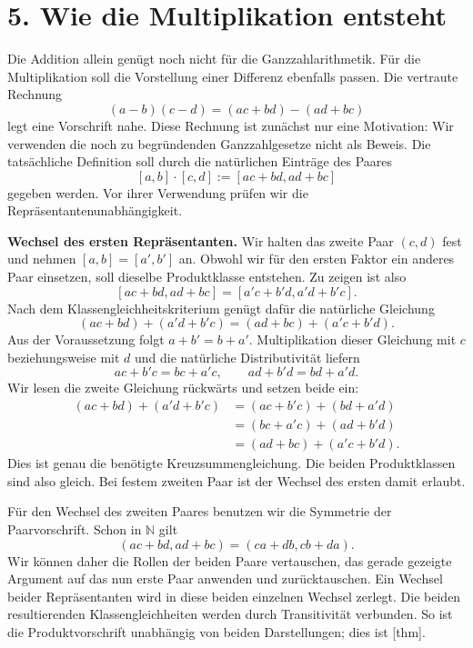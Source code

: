 \par{}
\hypertarget{integers.reading.multiplication}{}
\section*{5. Wie die Multiplikation entsteht}

Die Addition allein genügt noch nicht für die Ganzzahlarithmetik.
Für die Multiplikation soll die Vorstellung einer Differenz ebenfalls
passen. Die vertraute Rechnung
\[
  (a-b)(c-d)=(ac+bd)-(ad+bc)
\]
legt eine Vorschrift nahe. Diese Rechnung ist zunächst nur eine
Motivation: Wir verwenden die noch zu begründenden Ganzzahlgesetze
nicht als Beweis. Die tatsächliche Definition soll durch die
natürlichen Einträge des Paares
\[
  [a,b]\cdot[c,d]:=[ac+bd,ad+bc]
\]
gegeben werden. Vor ihrer Verwendung prüfen wir die
Repräsentantenunabhängigkeit.

\medskip\noindent\textbf{Wechsel des ersten Repräsentanten.}
Wir halten das zweite Paar \((c,d)\) fest und nehmen
\([a,b]=[a',b']\) an. Obwohl wir für den ersten Faktor ein
anderes Paar einsetzen, soll dieselbe Produktklasse entstehen.
Zu zeigen ist also
\[
  [ac+bd,ad+bc]=[a'c+b'd,a'd+b'c].
\]
Nach dem Klassengleichheitskriterium genügt dafür die natürliche
Gleichung
\[
  (ac+bd)+(a'd+b'c)=(ad+bc)+(a'c+b'd).
\]
Aus der Voraussetzung folgt \(a+b'=b+a'\). Multiplikation
dieser Gleichung mit \(c\) beziehungsweise mit \(d\)
und die natürliche Distributivität liefern
\[
  ac+b'c=bc+a'c,
  \qquad ad+b'd=bd+a'd.
\]
Wir lesen die zweite Gleichung rückwärts und setzen beide ein:
\[
  \begin{aligned}
    (ac+bd)+(a'd+b'c)
      &=(ac+b'c)+(bd+a'd)\\
      &=(bc+a'c)+(ad+b'd)\\
      &=(ad+bc)+(a'c+b'd).
  \end{aligned}
\]
Dies ist genau die benötigte Kreuzsummengleichung. Die beiden
Produktklassen sind also gleich. Bei festem zweiten Paar ist der
Wechsel des ersten damit erlaubt.

Für den Wechsel des zweiten Paares benutzen wir die Symmetrie der
Paarvorschrift. Schon in \(\mathbb N\) gilt
\[
  (ac+bd,ad+bc)=(ca+db,cb+da).
\]
Wir können daher die Rollen der beiden Paare vertauschen, das gerade
gezeigte Argument auf das nun erste Paar anwenden und zurücktauschen.
Ein Wechsel beider Repräsentanten wird in diese beiden einzelnen
Wechsel zerlegt. Die beiden resultierenden Klassengleichheiten werden
durch Transitivität verbunden. So ist die Produktvorschrift unabhängig
von beiden Darstellungen; dies ist
[thm].

